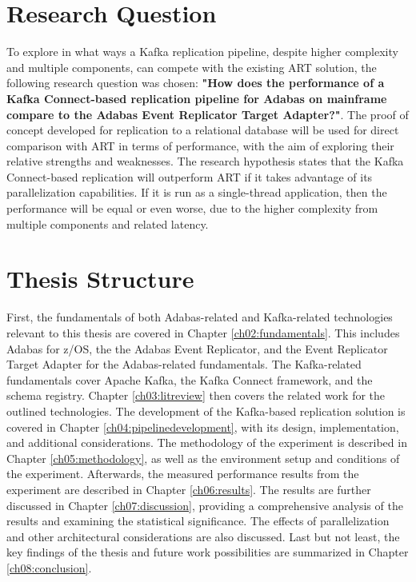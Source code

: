 \section{Research Question}
\label{ch01:intro:researchquestion}
To explore in what ways a Kafka replication pipeline, despite higher complexity and multiple components, can compete with the existing \ac{ART} solution, the following research question was chosen: \textbf{"How does the performance of a Kafka Connect-based replication pipeline for Adabas on mainframe compare to the Adabas Event Replicator Target Adapter?"}. The proof of concept developed for replication to a relational database will be used for direct comparison with \ac{ART} in terms of performance, with the aim of exploring their relative strengths and weaknesses. The research hypothesis states that the Kafka Connect-based replication will outperform \ac{ART} if it takes advantage of its parallelization capabilities. If it is run as a single-thread application, then the performance will be equal or even worse, due to the higher complexity from multiple components and related latency.

\section{Thesis Structure}
\label{ch01:intro:thesisstructure}
First, the fundamentals of both Adabas-related and Kafka-related technologies relevant to this thesis are covered in Chapter \ref{ch02:fundamentals}. This includes Adabas for z/OS, the the Adabas Event Replicator, and the Event Replicator Target Adapter for the Adabas-related fundamentals. The Kafka-related fundamentals cover Apache Kafka, the Kafka Connect framework, and the schema registry. Chapter \ref{ch03:litreview} then covers the related work for the outlined technologies. The development of the Kafka-based replication solution is covered in Chapter \ref{ch04:pipelinedevelopment}, with its design, implementation, and additional considerations. The methodology of the experiment is described in Chapter \ref{ch05:methodology}, as well as the environment setup and conditions of the experiment. Afterwards, the measured performance results from the experiment are described in Chapter \ref{ch06:results}. The results are further discussed in Chapter \ref{ch07:discussion}, providing a comprehensive analysis of the results and examining the statistical significance. The effects of parallelization and other architectural considerations are also discussed. Last but not least, the key findings of the thesis and future work possibilities are summarized in Chapter \ref{ch08:conclusion}.